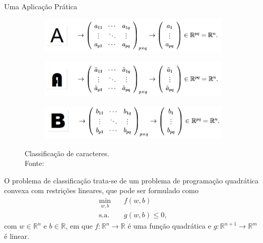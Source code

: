 \documentclass{beamer}
\def\RR{\mathds{R}}
\theoremstyle{definition}%
\begin{document}
\begin{frame}{Uma Aplicação Prática}
\begin{figure}[H]
	\centering
	\begin{subfigure}[h]{0.8\textwidth}
		\centering
		\includegraphics[width=\textwidth]{letraA_1.png}
	\end{subfigure}
	\begin{subfigure}[!h]{0.8\textwidth}
		\centering
		\includegraphics[width=\textwidth]{letraA_2.png}
	\end{subfigure}
	\begin{subfigure}[!h]{0.8\textwidth}
		\centering
		\includegraphics[width=\textwidth]{letraB.png}
	\end{subfigure}
	\caption{Classificação de caracteres. \\ Fonte: \textcite{Evelin2017}}
\end{figure}
\end{frame}


\begin{frame}
O problema de classificação trata-se de um problema de programação quadrática convexa com restrições lineares, que pode ser formulado como
\[
\begin{aligned}
\min_{w,b} & \quad f(w,b) \\
\text{s.a.} &  \quad g(w,b) \leq 0, \end{aligned}
\]
com $w\in \RR^n$ e $b\in \RR $, em que $f: \RR^n \rightarrow \RR$ é uma função quadrática e $g: \RR^{n+1} \rightarrow \RR^m$ é linear.

\end{frame}
\end{document}
